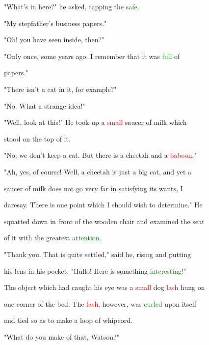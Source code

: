  "What's in here?" he asked, tapping the \textcolor{green}{safe.}



 "My stepfather's business papers."



 "Oh! you have seen inside, then?"



 "Only once, some years ago. I remember that it was \textcolor{green}{full} of

 papers."



 "There isn't a cat in it, for example?"



 "No. What a strange idea!"



 "Well, look at this!" He took up a \textcolor{red}{small} saucer of milk which

 stood on the \textcolor{BurntOrange}{top} of it.



 "No; we don't keep a cat. But there is a cheetah and a \textcolor{red}{baboon."}



 "Ah, yes, of course! Well, a cheetah is just a big cat, and yet a

 saucer of milk does not go very far in satisfying its wants, I

 daresay. There is one point which I should wish to determine." He

 squatted down in front of the wooden chair and examined the seat

 of it with the greatest \textcolor{green}{attention.}



 "Thank you. That is quite settled," said he, rising and putting

 his lens in his pocket. "Hullo! Here is something \textcolor{green}{interesting!"}



 The object which had caught his eye was a \textcolor{red}{small} dog \textcolor{red}{lash} hung on

 one corner of the bed. The \textcolor{red}{lash,} however, was \textcolor{green}{curled} upon itself

 and tied so as to make a loop of whipcord.



 "What do you make of that, Watson?"



